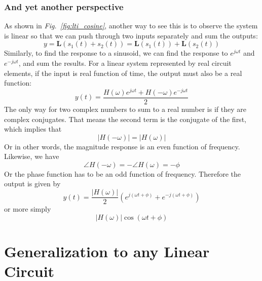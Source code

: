 \subsubsection{And yet another perspective}
As shown in \emph{Fig.~\ref{fig:lti_cosine}}, another way to see this is to observe the system is linear so that we can push through two inputs separately and sum the outputs:
    \begin{equation}
        y = \mathbf{L}(s_1(t) + s_2(t)) = \mathbf{L}(s_1(t)) + \mathbf{L}(s_2(t))
    \end{equation}
Similarly, to find the response to a sinusoid, we can find the response to $e^{j\omega t}$ and $e^{-j\omega t}$, and sum the results.  For a linear system represented by real circuit elements, if  the input is real function of time, the output must also be a real function:
    \begin{equation}
        y(t) = \frac{H(\omega) e^{j\omega t} + H(-\omega) e^{-j\omega t} }{2}
    \end{equation}
The only way for two complex numbers to sum to a real number is if they are complex conjugates.  That means the second term is the conjugate of the first, which implies that
    \begin{equation}
        |H(-\omega)| = |H(\omega)|
    \end{equation}
Or in other words, the magnitude response is an even function of frequency.  Likewise, we have
    \begin{equation}
        \angle H(-\omega) = -\angle H(\omega) = - \phi
    \end{equation}
Or the phase function has to be an odd function of frequency.  Therefore the output is given by
    \begin{equation}
        y(t) = \frac{|H(\omega)|}{2} \left( e^{j(\omega t + \phi)} + e^{-j(\omega t + \phi)} \right)
    \end{equation}
or more simply
    \begin{equation}
        |H(\omega)| \cos(\omega t + \phi)
    \end{equation}
\section{Generalization to any Linear Circuit}

